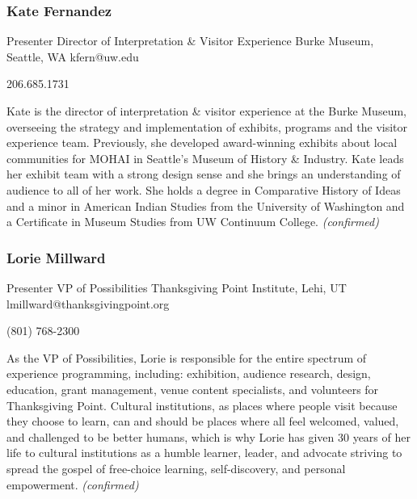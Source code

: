 \documentclass{report}
\begin{document}
              
                \subsubsection*{ Kate  Fernandez }
                Presenter\newline
                Director of Interpretation & Visitor Experience\newline
                Burke Museum, Seattle, WA
                \newline
                kfern@uw.edu\newline
                
                206.685.1731   \newline

                Kate is the director of interpretation \& visitor experience at the Burke Museum, overseeing the strategy and implementation of exhibits, programs and the visitor experience team. Previously, she developed award-winning exhibits about local communities for MOHAI in Seattle’s Museum of History \& Industry. Kate leads her exhibit team with a strong design sense and she brings an understanding of audience to all of her work. She holds a degree in Comparative History of Ideas and a minor in American Indian Studies from the University of Washington and a Certificate in Museum Studies from UW Continuum College.
                \emph{ (confirmed) }
              

              
                \subsubsection*{ Lorie Millward }
                Presenter\newline
                VP of Possibilities\newline
                Thanksgiving Point Institute, Lehi, UT 
                \newline
                lmillward@thanksgivingpoint.org\newline
                
                (801) 768-2300 \newline

                As the VP of Possibilities, Lorie is responsible for the entire spectrum of experience programming, including: exhibition, audience research, design, education, grant management, venue content specialists, and volunteers for Thanksgiving Point. Cultural institutions, as places where people visit because they choose to learn, can and should be places where all feel welcomed, valued, and challenged to be better humans, which is why Lorie has given 30 years of her life to cultural institutions as a humble learner, leader, and advocate striving to spread the gospel of free-choice learning, self-discovery, and personal empowerment.
                \emph{ (confirmed) }
              
\end{document}
